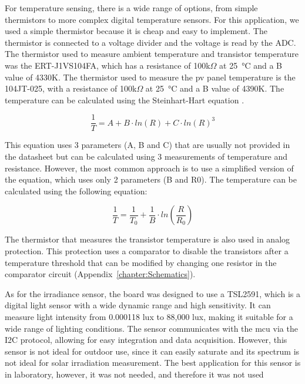     For temperature sensing, there is a wide range of options, from simple thermistors to more complex digital temperature sensors. For this application, we used a simple thermistor because it is cheap and easy to implement. The thermistor is connected to a voltage divider and the voltage is read by the ADC. The thermistor used to measure ambient temperature and transistor temperature was the ERT-J1VS104FA, which has a resistance of 100k$\Omega$ at 25~°C and a B value of 4330K. The thermistor used to measure the \ac{pv} panel temperature is the 104JT-025, with a resistance of 100k$\Omega$ at 25~°C and a B value of 4390K. 
    The temperature can be calculated using the Steinhart-Hart equation \cite{arduinodiy2015ntc}.

    \begin{equation}
        \frac{1}{T} = A + B \cdot ln(R) + C \cdot ln(R)^3
    \end{equation}

    This equation uses 3 parameters (A, B and C) that are usually not provided in the datasheet but can be calculated using 3 measurements of temperature and resistance. However, the most common approach is to use a simplified version of the equation, which uses only 2 parameters (B and R0). The temperature can be calculated using the following equation:

    \begin{equation}
        \frac{1}{T} = \frac{1}{T_0} + \frac{1}{B} \cdot ln(\frac{R}{R_0})
    \end{equation}

    The thermistor that measures the transistor temperature is also used in analog protection. This protection uses a comparator to disable the transistors after a temperature threshold that can be modified by changing one resistor in the comparator circuit (Appendix~\ref{chapter:Schematics}). 

    As for the irradiance sensor, the board was designed to use a TSL2591, which is a digital light sensor with a wide dynamic range and high sensitivity. It can measure light intensity from 0.000118 lux to 88,000 lux, making it suitable for a wide range of lighting conditions. The sensor communicates with the \ac{mcu} via the I2C protocol, allowing for easy integration and data acquisition. However, this sensor is not ideal for outdoor use, since it can easily saturate and its spectrum is not ideal for solar irradiation measurement. The best application for this sensor is in laboratory, however, it was not needed, and therefore it was not used


